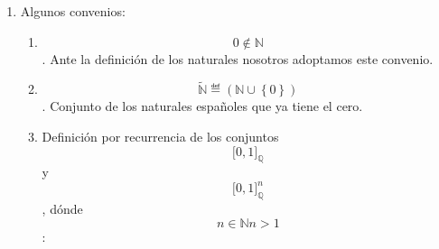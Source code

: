 \documentclass[
]{article}
\author{}
\date{}
\begin{document}
\begin{enumerate}
\def\labelenumi{\arabic{enumi}.}
\item
  Algunos convenios:

  \begin{enumerate}
  \def\labelenumii{\arabic{enumii}.}
  \item
    \[0 \notin \mathbb{N}\]. Ante la definición de los naturales
    nosotros adoptamos este convenio.
  \item
    \[\widetilde{\mathbb{N}} ≝ \left( {\mathbb{N} \cup \left\{ 0 \right\}} \right)\].
    Conjunto de los naturales españoles que ya tiene el cero.
  \item
    Definición por recurrencia de los conjuntos
    \[\lbrack 0,1\rbrack_{\mathbb{Q}}\]y
    \[\lbrack 0,1\rbrack_{\mathbb{Q}}^{n}\], dónde
    \[{n \in \mathbb{N}}{n > 1}\]:


\end{enumerate}
\end{enumerate}
\end{document}

